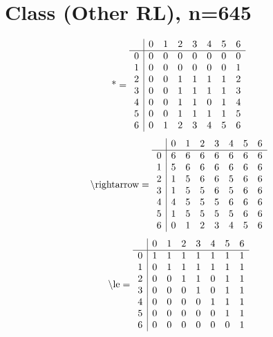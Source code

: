 \documentclass[11pt]{article}
\begin{document}
\section{Class (Other RL), n=645}
\[\text{*} = 
\begin{array}{r | r r r r r r r}
 & 0 & 1 & 2 & 3 & 4 & 5 & 6 \\ \hline
0 & 0 & 0 & 0 & 0 & 0 & 0 & 0 \\
1 & 0 & 0 & 0 & 0 & 0 & 0 & 1 \\
2 & 0 & 0 & 1 & 1 & 1 & 1 & 2 \\
3 & 0 & 0 & 1 & 1 & 1 & 1 & 3 \\
4 & 0 & 0 & 1 & 1 & 0 & 1 & 4 \\
5 & 0 & 0 & 1 & 1 & 1 & 1 & 5 \\
6 & 0 & 1 & 2 & 3 & 4 & 5 & 6 \\
\end{array}
\]
\[\text{\textbackslash rightarrow} = 
\begin{array}{r | r r r r r r r}
 & 0 & 1 & 2 & 3 & 4 & 5 & 6 \\ \hline
0 & 6 & 6 & 6 & 6 & 6 & 6 & 6 \\
1 & 5 & 6 & 6 & 6 & 6 & 6 & 6 \\
2 & 1 & 5 & 6 & 6 & 5 & 6 & 6 \\
3 & 1 & 5 & 5 & 6 & 5 & 6 & 6 \\
4 & 4 & 5 & 5 & 5 & 6 & 6 & 6 \\
5 & 1 & 5 & 5 & 5 & 5 & 6 & 6 \\
6 & 0 & 1 & 2 & 3 & 4 & 5 & 6 \\
\end{array}
\]
\[\text{\textbackslash le} = 
\begin{array}{r | r r r r r r r}
 & 0 & 1 & 2 & 3 & 4 & 5 & 6 \\ \hline
0 & 1 & 1 & 1 & 1 & 1 & 1 & 1 \\
1 & 0 & 1 & 1 & 1 & 1 & 1 & 1 \\
2 & 0 & 0 & 1 & 1 & 0 & 1 & 1 \\
3 & 0 & 0 & 0 & 1 & 0 & 1 & 1 \\
4 & 0 & 0 & 0 & 0 & 1 & 1 & 1 \\
5 & 0 & 0 & 0 & 0 & 0 & 1 & 1 \\
6 & 0 & 0 & 0 & 0 & 0 & 0 & 1 \\
\end{array}
\]
\end{document}
